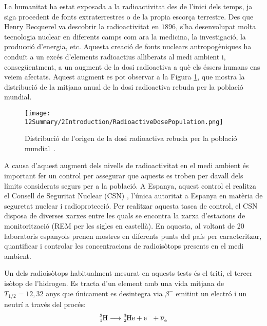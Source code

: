 La humanitat ha estat exposada a la radioactivitat des de l'inici dels temps, ja siga procedent de fonts extraterrestres o de la propia escorça terrestre. Des que Henry Becquerel va descobrir la radioactivitat en $1896$, s'ha desenvolupat molta tecnologia nuclear en diferents camps com ara la medicina, la investigació, la producció d'energia, etc. Aquesta creació de fonts nuclears antropogèniques ha conduït a un excés d'elements radioactius alliberats al medi ambient i, consegüentment, a un augment de la dosi radioactiva a què els éssers humans ens veiem afectats. Aquest augment es pot observar a la Figura  \ref{fig:DosiRadioactiva}, que mostra la distribució de la mitjana anual de la dosi radioactiva rebuda per la població mundial.

\begin{figure}[h]
\texttt{[image: 12Summary/2Introduction/RadioactiveDosePopulation.png]}
\centering
\caption{Distribució de l'origen de la dosi radioactiva rebuda per la població mundial~\cite{IAEA}\label{fig:DosiRadioactiva}.}
\end{figure}

A causa d'aquest augment dels nivells de radioactivitat en el medi ambient és important fer un control per assegurar que aquests es troben per davall dels límits considerats segurs per a la població. A Espanya, aquest control el realitza el Consell de Seguritat Nuclear (CSN) \cite{CSN}, l'única autoritat a Espanya en matèria de seguretat nuclear i radioprotecció. Per realitzar aquesta tasca de control, el CSN disposa de diverses xarxes entre les quals se encontra la xarxa d'estacions de monitorització (REM per les sigles en castellà). En aquesta, al voltant de 20 laboratoris espanyols prenen mostres en diferents punts del país per caracteritzar, quantificar i controlar les concentracions de radioisòtops presents en el medi ambient.

Un dels radioisòtops habitualment mesurat en aquests tests és el triti, el tercer isòtop de l'hidrogen. Es tracta d'un element amb una vida mitjana de $T_{1/2} = 12,32$ anys que únicament es desintegra via $\beta^{-}$ emitint un electró i un neutrí a través del procés:
\begin{equation}
\ce{^{3}_{1}H} \longrightarrow \ce{^{3}_{2}He}  + \ce{e^-}  + \ce{\overline{\nu}_e}
\label{eq:DecaimentTriti}
\end{equation}

